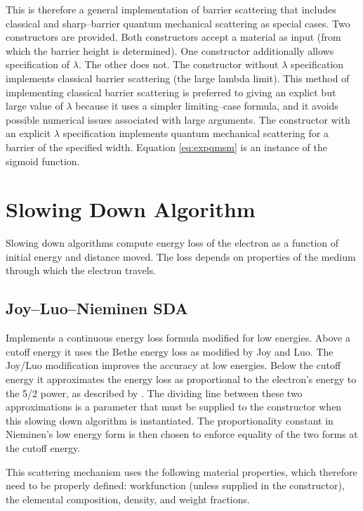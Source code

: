This is therefore a general implementation of barrier scattering that includes classical and sharp--barrier quantum mechanical scattering as special cases. Two constructors are provided. Both constructors accept a material as input (from which the barrier height is determined). One constructor additionally allows specification of $\lambda$. The other does not. The constructor without $\lambda$ specification implements classical barrier scattering (the large lambda limit). This method of implementing classical barrier scattering is preferred to giving an explict but large value of $\lambda$ because it uses a simpler limiting--case formula, and it avoids possible numerical issues associated with large arguments. The constructor with an explicit $\lambda$ specification implements quantum mechanical scattering for a barrier of the specified width. Equation \ref{eq:expqmsm} is an instance of the sigmoid function. 

\section{Slowing Down Algorithm}\label{con:sda}
Slowing down algorithms compute energy loss of the electron as a function of initial energy and distance moved. The loss depends on properties of the medium through which the electron travels. 
 
\subsection{Joy--Luo--Nieminen SDA}
Implements a continuous energy loss formula modified for low energies. Above a cutoff energy it uses the Bethe energy loss as modified by Joy and Luo. The Joy/Luo modification improves the accuracy at low energies. Below the cutoff energy it approximates the energy loss as proportional to the electron's energy to the 5/2 power, as described by \cite{Nieminen}. The dividing line between these two approximations is a parameter that must be supplied to the constructor when this slowing down algorithm is instantiated. The proportionality constant in Nieminen's low energy form is then chosen to enforce equality of the two forms at the cutoff energy. 

This scattering mechanism uses the following material properties, which therefore need to be properly defined: workfunction (unless supplied in the constructor), the elemental composition, density, and weight fractions. 